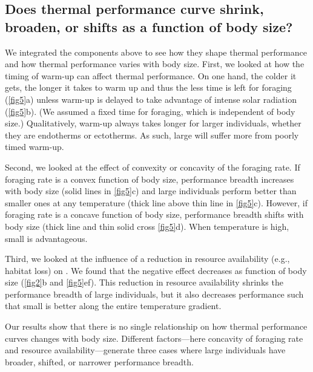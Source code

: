 \subsection*{Does thermal performance curve shrink, broaden, or shifts as a function of body size?}
We integrated the components above to see how they shape thermal performance and how thermal performance varies with body size.
First, we looked at how the timing of warm-up can affect thermal performance.
On one hand, the colder it gets, the longer it takes to warm up and thus the less time is left for foraging (\cref{fig5}a) unless warm-up is delayed to take advantage of intense solar radiation (\cref{fig5}b).
(We assumed a fixed time for foraging, which is independent of body size.)
Qualitatively, warm-up always takes longer for larger individuals, whether they are endotherms or ectotherms.
As such, large will suffer more from poorly timed warm-up.

Second, we looked at the effect of convexity or concavity of the foraging rate.
If foraging rate is a convex function of body size, performance breadth increases with body size (solid lines in \cref{fig5}c) and large individuals perform better than smaller ones at any temperature (thick line above thin line in \cref{fig5}c).
However, if foraging rate is a concave function of body size, performance breadth shifts with body size (thick line and thin solid cross \cref{fig5}d).
When temperature is high, small is advantageous.

Third, we looked at the influence of a reduction in resource availability (e.g., habitat loss) on .
We found that the negative effect decreases as function of body size (\cref{fig2}b and \cref{fig5}ef).
This reduction in resource availability shrinks the performance breadth of large individuals, but it also decreases performance such that small is better along the entire temperature gradient.


Our results show that there is no single relationship on how thermal performance curves changes with body size.
Different factors---here concavity of foraging  rate and resource availability---generate three cases where large individuals have broader, shifted, or narrower performance breadth.
